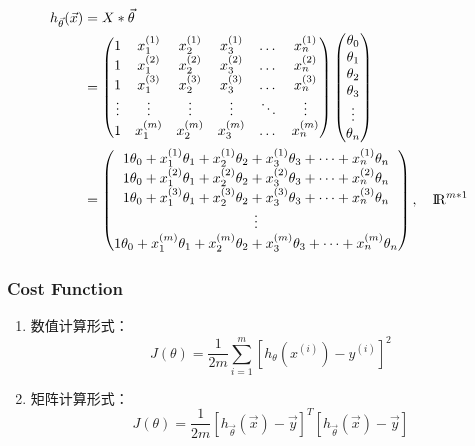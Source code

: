 \begin{enumerate}
\begin{equation}\begin{aligned}
	h_{\vec{\theta}}(\vec{x}) &= X * \vec{\theta} \\
	    & = \left(\begin{matrix}
			1 & x_1^{(1)} & x_2^{(1)} & x_3^{(1)} & \dots & x_n^{(1)} \\
			1 & x_1^{(2)} & x_2^{(2)} & x_3^{(2)} & \dots & x_n^{(2)} \\
			1 & x_1^{(3)} & x_2^{(3)} & x_3^{(3)} & \dots & x_n^{(3)} \\
			\vdots    & \vdots    & \vdots    & \vdots    & \ddots & \vdots   \\
			1 & x_1^{(m)} & x_2^{(m)} & x_3^{(m)} & \dots & x_n^{(m)} \\
		\end{matrix}\right)
		\left(\begin{matrix}
			\theta_0 \\ \theta_1 \\ \theta_2 \\ \theta_3 \\ \vdots \\ \theta_n \\
		\end{matrix}\right) \\
		& = \left(\begin{matrix}
			1\theta_0 + x_1^{(1)}\theta_1 + x_2^{(1)}\theta_2 + x_3^{(1)}\theta_3 + \dots + x_n^{(1)}\theta_n \\
			1\theta_0 + x_1^{(2)}\theta_1 + x_2^{(2)}\theta_2 + x_3^{(2)}\theta_3 + \dots + x_n^{(2)}\theta_n \\
			1\theta_0 + x_1^{(3)}\theta_1 + x_2^{(3)}\theta_2 + x_3^{(3)}\theta_3 + \dots + x_n^{(3)}\theta_n \\
			\vdots \\
			1\theta_0 + x_1^{(m)}\theta_1 + x_2^{(m)}\theta_2 + x_3^{(m)}\theta_3 + \dots + x_n^{(m)}\theta_n \\
		\end{matrix}\right), \quad {\rm I\!R}^{{m*1}}
\end{aligned}\end{equation}
\end{enumerate}

\subsubsection{Cost Function}
\begin{enumerate}
\item 数值计算形式：
\begin{equation}
	J(\theta) = \frac{1}{2m} \sum_{i=1}^m \left[ h_\theta(x^{(i)}) - y^{(i)}\right]^2
\end{equation}

\item 矩阵计算形式：
\begin{equation}
	J(\theta) = \frac{1}{2m} \left[h_{\vec{\theta}}(\vec{x}) - \vec{y}\right]^T \left[ h_{\vec{\theta}}(\vec{x}) - \vec{y}\right]
\end{equation}
\end{enumerate}


